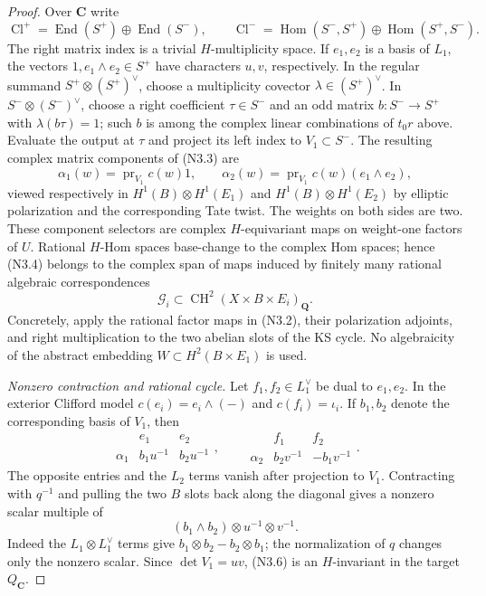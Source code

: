 \documentclass[11pt,reqno]{article}
\theoremstyle{emphasizedplain}
\theoremstyle{emphasizeddefinition}
\theoremstyle{emphasizeddefinition}
\DeclareMathOperator{\End}{End}
\DeclareMathOperator{\Hom}{Hom}
\DeclareMathOperator{\CH}{CH}
\newcommand{\Q}{\mathbf Q}
\newcommand{\C}{\mathbf C}
\begin{document}
\begin{proof}
Over $\C$ write
\[
 \operatorname{Cl}^+
   =\End(S^+)\oplus\End(S^-),\qquad
 \operatorname{Cl}^-
   =\Hom(S^-,S^+)\oplus\Hom(S^+,S^-).
\]
The right matrix index is a trivial $H$-multiplicity space. If
$e_1,e_2$ is a basis of $L_1$, the vectors $1,e_1\wedge e_2\in S^+$
have characters $u,v$, respectively. In the regular summand
$S^+\otimes(S^+)^\vee$, choose a multiplicity covector
$\lambda\in(S^+)^\vee$. In $S^-\otimes(S^-)^\vee$, choose a
right coefficient $\tau\in S^-$ and an odd matrix
$b:S^-\to S^+$ with $\lambda(b\tau)=1$; such $b$ is among the
complex linear combinations of $t_0r$ above. Evaluate the output
at $\tau$ and project its left index to $V_1\subset S^-$.
The resulting complex matrix components
of (N3.3) are
\[
 \alpha_1(w)=\operatorname{pr}_{V_1}c(w)1,
 \qquad
 \alpha_2(w)=\operatorname{pr}_{V_1}c(w)(e_1\wedge e_2),
                                                        \tag{N3.4}
\]
viewed respectively in
$H^1(B)\otimes H^1(E_1)$ and
$H^1(B)\otimes H^1(E_2)$ by elliptic polarization and the
corresponding Tate twist. The weights on both sides are two.
These component selectors are complex $H$-equivariant maps on
weight-one factors of $U$. Rational $H$-Hom spaces base-change to
the complex Hom spaces; hence (N3.4) belongs to the complex span of
maps induced by finitely many rational algebraic correspondences
\[
 \mathcal G_i\subset\CH^2(X\times B\times E_i)_\Q.
                                                        \tag{N3.5}
\]
Concretely, apply the rational factor maps in (N3.2), their
polarization adjoints, and right multiplication to the two abelian
slots of the KS cycle. No algebraicity of the abstract embedding
$W\subset H^2(B\times E_1)$ is used.

\emph{Nonzero contraction and rational cycle.}
Let $f_1,f_2\in L_1^\vee$ be dual to $e_1,e_2$. In the exterior
Clifford model $c(e_i)=e_i\wedge(-)$ and $c(f_i)=\iota_i$.
If $b_1,b_2$ denote the corresponding basis of $V_1$, then
\[
 \begin{array}{c|cc}&e_1&e_2\\\hline
 \alpha_1&b_1u^{-1}&b_2u^{-1}
 \end{array},\qquad
 \begin{array}{c|cc}&f_1&f_2\\\hline
 \alpha_2&b_2v^{-1}&-b_1v^{-1}
 \end{array}.
\]
The opposite entries and the $L_2$ terms vanish after projection
to $V_1$. Contracting with $q^{-1}$ and pulling the two $B$ slots
back along the diagonal gives a nonzero scalar multiple of
\[
        (b_1\wedge b_2)\otimes u^{-1}\otimes v^{-1}.
                                                        \tag{N3.6}
\]
Indeed the $L_1\otimes L_1^\vee$ terms give
$b_1\otimes b_2-b_2\otimes b_1$; the normalization of $q$ changes
only the nonzero scalar. Since $\det V_1=uv$, (N3.6) is an
$H$-invariant in the target $Q_\C$.


\end{proof}
\end{document}
